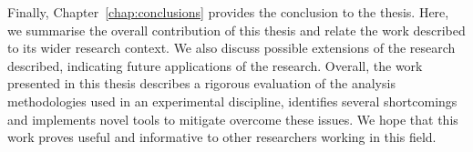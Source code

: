 Finally, Chapter~\ref{chap:conclusions} provides the conclusion to the thesis. Here, we summarise the overall contribution of this thesis and relate the work described to its wider research context. We also discuss possible extensions of the research described, indicating future applications of the research. Overall, the work presented in this thesis describes a rigorous evaluation of the analysis methodologies used in an experimental discipline, identifies several shortcomings and implements novel tools to mitigate overcome these issues. We hope that this work proves useful and informative to other researchers working in this field.


